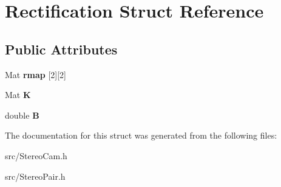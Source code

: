 \hypertarget{struct_rectification}{}\section{Rectification Struct Reference}
\label{struct_rectification}
\subsection*{Public Attributes}
\begin{DoxyCompactItemize}
\item 
Mat {\bfseries rmap} \mbox{[}2\mbox{]}\mbox{[}2\mbox{]}\hypertarget{struct_rectification_a6185c386041ef25d517ac3de6cccbaf3}{}\label{struct_rectification_a6185c386041ef25d517ac3de6cccbaf3}

\item 
Mat {\bfseries K}\hypertarget{struct_rectification_af1c5ad34e66e45688c8d89058686be97}{}\label{struct_rectification_af1c5ad34e66e45688c8d89058686be97}

\item 
double {\bfseries B}\hypertarget{struct_rectification_a6e80bd15933360b9d2c751af181a8387}{}\label{struct_rectification_a6e80bd15933360b9d2c751af181a8387}

\end{DoxyCompactItemize}


The documentation for this struct was generated from the following files\+:\begin{DoxyCompactItemize}
\item 
src/Stereo\+Cam.\+h\item 
src/Stereo\+Pair.\+h\end{DoxyCompactItemize}

